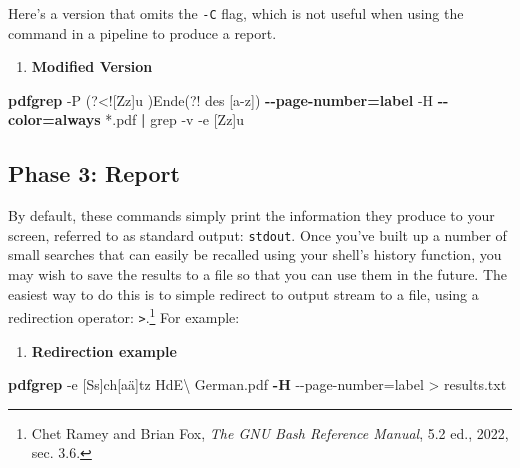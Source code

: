 \documentclass[
  letterpaper,
]{tufte-handout}
\newenvironment{Shaded}{\begin{snugshade}}{\end{snugshade}}
\newcommand{\AttributeTok}[1]{\textcolor[rgb]{0.00,0.34,0.68}{#1}}
\newcommand{\DataTypeTok}[1]{\textcolor[rgb]{0.00,0.34,0.68}{#1}}
\newcommand{\ExtensionTok}[1]{\textcolor[rgb]{0.00,0.58,1.00}{\textbf{#1}}}
\newcommand{\FunctionTok}[1]{\textcolor[rgb]{0.39,0.29,0.61}{#1}}
\newcommand{\KeywordTok}[1]{\textcolor[rgb]{0.12,0.11,0.11}{\textbf{#1}}}
\newcommand{\NormalTok}[1]{\textcolor[rgb]{0.12,0.11,0.11}{#1}}
\newcommand{\OperatorTok}[1]{\textcolor[rgb]{0.12,0.11,0.11}{#1}}
\newcommand{\PreprocessorTok}[1]{\textcolor[rgb]{0.00,0.43,0.16}{#1}}
\newcommand{\StringTok}[1]{\textcolor[rgb]{0.75,0.01,0.01}{#1}}
\providecommand{\tightlist}{%
  \setlength{\itemsep}{0pt}\setlength{\parskip}{0pt}}
\begin{document}
Here's a version that omits the \texttt{-C} flag, which is not useful
when using the command in a pipeline to produce a report.

\begin{enumerate}
\def\labelenumi{(\arabic{enumi})}
\setcounter{enumi}{7}
\tightlist
\item
  \textbf{Modified Version}
\end{enumerate}

\begin{Shaded}
\begin{Highlighting}[]
\ExtensionTok{pdfgrep}  \AttributeTok{{-}P} \StringTok{\textquotesingle{}(?\textless{}![Zz]u )Ende(?! des [a{-}z])\textquotesingle{}} 
\ExtensionTok{{-}{-}page{-}number=label} \AttributeTok{{-}H}  
\ExtensionTok{{-}{-}color=always} \PreprocessorTok{*}\NormalTok{.pdf }\KeywordTok{|} \FunctionTok{grep} \AttributeTok{{-}v} \AttributeTok{{-}e} \StringTok{\textquotesingle{}[Zz]u\textquotesingle{}}
\end{Highlighting}
\end{Shaded}

\subsection{Phase 3: Report}\label{phase-3-report}

By default, these commands simply print the information they produce to
your screen, referred to as standard output: \texttt{stdout}. Once
you've built up a number of small searches that can easily be recalled
using your shell's history function, you may wish to save the results to
a file so that you can use them in the future. The easiest way to do
this is to simple redirect to output stream to a file, using a
redirection operator: \texttt{\textgreater{}}.\footnote{Chet Ramey and
  Brian Fox, \emph{The GNU Bash Reference Manual}, 5.2 ed., 2022, sec.
  3.6.} For example:

\begin{enumerate}
\def\labelenumi{(\arabic{enumi})}
\setcounter{enumi}{8}
\tightlist
\item
  \textbf{Redirection example}
\end{enumerate}

\begin{Shaded}
\begin{Highlighting}[]
\ExtensionTok{pdfgrep} \AttributeTok{{-}e} \StringTok{\textquotesingle{}[Ss]ch[aä]tz\textquotesingle{}}\NormalTok{ HdE}\DataTypeTok{\textbackslash{} }\NormalTok{German.pdf }
\ExtensionTok{{-}H} \AttributeTok{{-}{-}page{-}number}\OperatorTok{=}\NormalTok{label }\OperatorTok{\textgreater{}}\NormalTok{ results.txt}
\end{Highlighting}
\end{Shaded}
\end{document}
